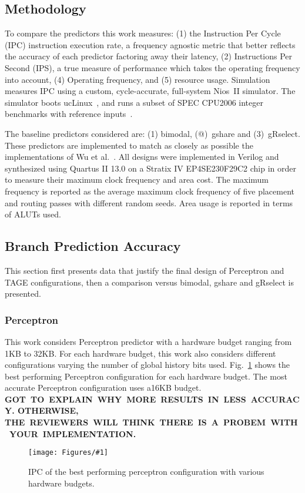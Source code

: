 \documentclass[conference]{IEEEtran}
\newcommand{\kfig}[4]{ %
        \begin{figure}[!t]
        \centering
        \texttt{[image: Figures/\#1]}
        \vspace{-1mm}
        \caption{#3}
        \label{#2}
        \end{figure}
}
\begin{document}
\subsection{Methodology}
\label{sec:eval:methodology}
To compare the predictors this work measures: (1) the Instruction Per Cycle (IPC) instruction execution rate, a frequency agnostic metric that better reflects the accuracy of each predictor factoring away their latency, (2) Instructions Per Second (IPS), a true measure of performance which takes the operating frequency into account, (4) Operating frequency, and (5) resource usage. Simulation measures IPC using a custom, cycle-accurate, full-system Nios~II simulator. The simulator boots ucLinux~\cite{uclinux}, and runs a subset of SPEC CPU2006 integer benchmarks with reference inputs~\cite{spec2k6}.

The baseline predictors considered are: (1) bimodal, (@)\ gshare and (3)\ gRselect. These predictors are implemented to match as closely as possible the implementations of Wu et al.~\cite{grselect}. All designs were implemented in Verilog and synthesized using Quartus II 13.0 on a Stratix IV EP4SE230F29C2 chip in order to measure their maximum clock frequency and area cost. The maximum frequency is reported as the average maximum clock frequency of five placement and routing passes with different random seeds. Area usage is reported in terms of ALUTs used.


\subsection{Branch Prediction Accuracy}
\label{sec:eval:ipc}
This section first presents data that justify the final design of Perceptron and TAGE configurations, then a comparison versus bimodal, gshare and gRselect is presented.

\subsubsection{Perceptron}
\label{sec:eval:ipc:perceptron}
This work considers Perceptron predictor with a hardware budget ranging from 1KB to 32KB. For each hardware budget, this work also considers different configurations varying the number of global history bits used. Fig.~\ref{fig:perceptronIPC} shows the best performing Perceptron configuration for each hardware budget. The most accurate Perceptron configuration uses a16KB budget. \textbf{GOT\ TO\ EXPLAIN\ WHY\ MORE\ RESULTS\ IN\ LESS\ ACCURACY. OTHERWISE, THE\ REVIEWERS\ WILL\ THINK\ THERE\ IS\ A\ PROBEM\ WITH\ YOUR\ IMPLEMENTATION.\ \ \ }
\kfig{perceptronIPC.pdf}{fig:perceptronIPC}{IPC of the best performing perceptron configuration with various hardware budgets.}{angle = 0, trim = 0.9in 4in 0.8in 4.5in, clip, width=0.4\textwidth}
\end{document}
